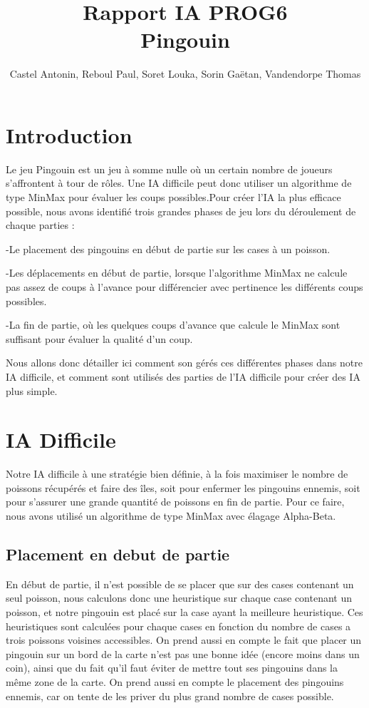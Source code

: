 \documentclass{report}
\title{\textbf{Rapport IA PROG6}\\Pingouin}
\author{Castel Antonin, Reboul Paul, Soret Louka, Sorin Gaëtan, Vandendorpe Thomas}
\begin{document}
\maketitle{}
\tableofcontents
\chapter{Introduction}
Le jeu Pingouin est un jeu à somme nulle où un certain nombre de joueurs s'affrontent à tour de rôles. Une IA difficile peut donc utiliser un algorithme de type MinMax pour évaluer les coups possibles.Pour créer l'IA la plus efficace possible, nous avons identifié trois grandes phases de jeu lors du déroulement de chaque parties :
\newline

-Le placement des pingouins en début de partie sur les cases à un poisson.


-Les déplacements en début de partie, lorsque l'algorithme MinMax ne calcule 
pas assez de coups à l'avance pour différencier avec pertinence les différents coups possibles.


-La fin de partie, où les quelques coups d'avance que calcule le MinMax sont 
suffisant pour évaluer la qualité d'un coup.

Nous allons donc détailler ici comment son gérés ces différentes phases dans notre IA difficile, et comment sont utilisés des parties de l'IA difficile pour créer des IA plus simple.
\chapter{IA Difficile}
Notre IA difficile à une stratégie bien définie, à la fois maximiser le nombre de poissons récupérés et faire des îles, soit pour enfermer les pingouins ennemis, soit pour s'assurer une grande quantité de poissons en fin de partie.
Pour ce faire, nous avons utilisé un algorithme de type MinMax avec élagage Alpha-Beta.
\section{Placement en debut de partie}
En début de partie, il n'est possible de se placer que sur des cases contenant un seul poisson, nous calculons donc une heuristique sur chaque case contenant un poisson, et notre pingouin est placé sur la case ayant la meilleure heuristique.
Ces heuristiques sont calculées pour chaque cases en fonction du nombre de cases a trois poissons voisines accessibles. 
\newline
On prend aussi en compte le fait que placer un pingouin sur un bord de la carte n'est pas une bonne idée (encore moins dans un coin), ainsi que du fait qu'il faut éviter de mettre tout ses pingouins dans la même zone de la carte.
\newline
On prend aussi en compte le placement des pingouins ennemis, car on tente de les priver du plus grand nombre de cases possible.
\end{document}
